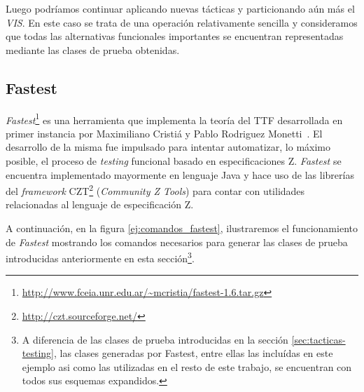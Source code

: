 Luego podríamos continuar aplicando nuevas tácticas y particionando aún más el \emph{VIS}. En este caso se trata de una operación relativamente sencilla y consideramos que todas las alternativas funcionales importantes se encuentran representadas mediante las clases de prueba obtenidas.

\subsection{Fastest}
\label{sec:fastest}

\emph{Fastest}\footnote{\url{http://www.fceia.unr.edu.ar/~mcristia/fastest-1.6.tar.gz}} es una herramienta que implementa la teoría del TTF desarrollada en primer instancia por Maximiliano Cristiá y Pablo Rodriguez Monetti~\cite{fastest1}. El desarrollo de la misma fue impulsado para intentar automatizar, lo máximo posible, el proceso de \textit{testing} funcional basado en especificaciones Z. \emph{Fastest} se encuentra implementado mayormente en lenguaje Java y hace uso de las librerías del \textit{framework} CZT\footnote{\url{http://czt.sourceforge.net/}} (\emph{Community Z Tools}) para contar con utilidades relacionadas al lenguaje de especificación Z. 

A continuación, en la figura \ref{ej:comandos_fastest}, ilustraremos el funcionamiento de \emph{Fastest} mostrando los comandos necesarios para generar las clases de prueba introducidas anteriormente en esta sección\footnote{A diferencia de las clases de prueba introducidas en la sección \ref{sec:tacticas-testing}, las clases generadas por Fastest, entre ellas las incluídas en este ejemplo asi como las utilizadas en el resto de este trabajo, se encuentran con todos sus esquemas expandidos.}.


